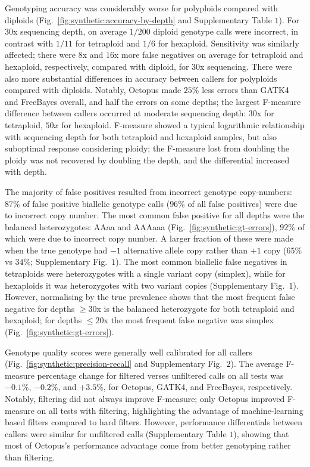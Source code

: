 \documentclass[notitlepage, twocolumn, 10pt]{article}
\begin{document}
Genotyping accuracy was considerably worse for polyploids compared with diploids (Fig.\ \ref{fig:synthetic:accuracy-by-depth} and Supplementary Table $1$). For $30$x sequencing depth, on average $1/200$ diploid genotype calls were incorrect, in contrast with $1/11$ for tetraploid and $1/6$ for hexaploid. Sensitivity was similarly affected; there were $8$x and $16$x more false negatives on average for tetraploid and hexaploid, respectively, compared with diploid, for $30$x sequencing. There were also more substantial differences in accuracy between callers for polyploids compared with diploids. Notably, Octopus made $25\%$ less errors than GATK4 and FreeBayes overall, and half the errors on some depths; the largest F-measure difference between callers occurred at moderate sequencing depth: $30$x for tetraploid, $50x$ for hexaploid. F-measure showed a typical logarithmic relationship with sequencing depth for both tetraploid and hexaploid samples, but also suboptimal response considering ploidy; the F-measure lost from doubling the ploidy was not recovered by doubling the depth, and the differential increased with depth.

The majority of false positives resulted from incorrect genotype copy-numbers: $87\%$ of false positive biallelic genotype calls ($96\%$ of all false positives) were due to incorrect copy number. The most common false positive for all depths were the balanced heterozygotes: AAaa and AAAaaa (Fig.\ \ref{fig:synthetic:gt-errors}), $92\%$ of which were due to incorrect copy number. A larger fraction of these were made when the true genotype had $-1$ alternative allele copy rather than $+1$ copy ($65\%$ vs $34\%$; Supplementary Fig.\ $1$). The most common biallelic false negatives in tetraploids were heterozygotes with a single variant copy (simplex), while for hexaploids it was heterozygotes with two variant copies (Supplementary Fig.\ $1$). However, normalising by the true prevalence shows that the most frequent false negative for depths $\ge 30$x is the balanced heterozygote for both tetraploid and hexaploid; for depths $\le 20$x the most frequent false negative was simplex (Fig.\ \ref{fig:synthetic:gt-errors}).

Genotype quality scores were generally well calibrated for all callers (Fig.\ \ref{fig:synthetic:precision-recall} and Supplementary Fig.\ $2$). The average F-measure percentage change for filtered verses unfiltered calls on all tests was $-0.1\%$, $-0.2\%$, and $+3.5\%$, for Octopus, GATK4, and FreeBayes, respectively. Notably, filtering did not always improve F-measure; only Octopus improved F-measure on all tests with filtering, highlighting the advantage of machine-learning based filters compared to hard filters. However, performance differentials between callers were similar for unfiltered calls (Supplementary Table $1$), showing that most of Octopus's performance advantage come from better genotyping rather than filtering.
\end{document}
